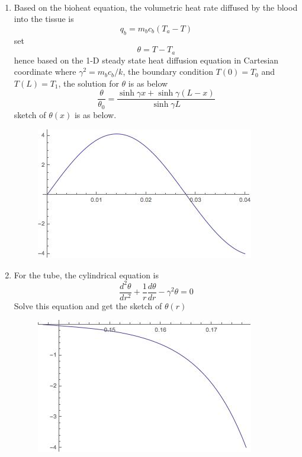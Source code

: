 \begin{solution}
~
\begin{enumerate}
\item
Based on the bioheat equation, the volumetric heat rate diffused by the blood into the tissue is 
$$q_b=m_b c_b(T_a-T)$$
set$$\theta = T-T_a$$
hence based on the 1-D steady state heat diffusion equation in Cartesian coordinate
where $\gamma^2=m_b c_b/k$, the boundary condition $T(0)=T_0$ and  $T(L)=T_1$,
the solution for $\theta$ is as below
$$\frac{\theta}{\theta_0}=\frac{\sinh\gamma x+\sinh\gamma(L-x)}{\sinh\gamma L}$$
sketch of $\theta(x)$ is as below.
\begin{figure}[h!]
  \centering
    \includegraphics[scale=0.6]{figures/ch2/10}
\end{figure}
\item
For the tube, the cylindrical equation is
$$\frac{d^2 \theta}{dr^2} + \frac{1}{r}\frac{d\theta}{dr}-\gamma^2\theta=0$$
Solve this equation and get the sketch of $\theta(r)$
\begin{figure}[h!]
  \centering
    \includegraphics[scale=0.6]{figures/ch2/11}
\end{figure}
\end{enumerate}
\end{solution}

